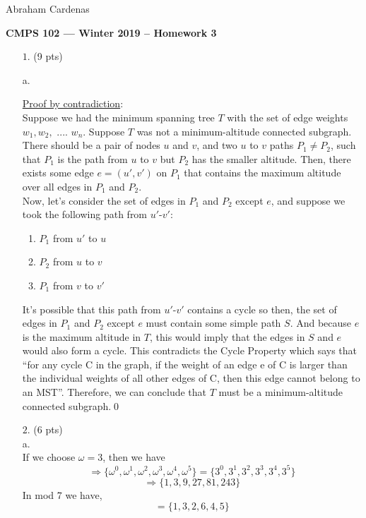 \documentclass[11pt]{article}
\begin{document}
\hfill Abraham Cardenas


\begin{center}
{\bf\Large CMPS 102 --- Winter 2019 --  Homework 3}
\end{center}

\newcommand{\Mod}[1]{\ \mathrm{mod}\ #1}

\begin{itemize}

\item[$1.$] (9 pts)

a.

\underline{Proof by contradiction}:\\
Suppose we had the minimum spanning tree $T$ with the set of edge weights $w_1, w_2,$ .... $w_n$.  Suppose $T$ was not a minimum-altitude connected subgraph. There should be a pair of nodes $u$ and $v$, and two $u$ to $v$ paths $P_1 \neq P_2$, such that $P_1$ is the path from $u$ to $v$ but $P_2$ has the smaller altitude. Then, there exists some edge $e = (u',v')$ on $P_1$ that contains the maximum altitude over all edges in $P_1$ and $P_2$.\\ 
Now, let's consider the set of edges in $P_1$ and $P_2$ except $e$, and suppose we took the following path from $u'$-$v'$:
\begin{enumerate}
  \item $P_1$ from $u'$ to $u$
  \item $P_2$ from $u$ to $v$
  \item $P_1$ from $v$ to $v'$
\end{enumerate}
It's possible that this path from $u'$-$v'$ contains a cycle so then, the set of edges in $P_1$ and $P_2$ except $e$ must contain some simple path $S$. And because $e$ is the maximum altitude in $T$, this would imply that the edges in $S$ and $e$ would also form a cycle. This contradicts the Cycle Property which says that ``for any cycle C in the graph, if the weight of an edge e of C is larger than the individual weights of all other edges of C, then this edge cannot belong to an MST''. Therefore, we can conclude that $T$ must be a minimum-altitude connected subgraph.\hspace{7.5cm}\qed


\item[$2.$] (6 pts)\\
a.\\
If we choose $\omega = 3$, then we have $$\Rightarrow \big\{ \omega^0, \omega^1, \omega^2, \omega^3, \omega^4, \omega^5  \big\} = \big\{ 3^0,  3^1, 3^2, 3^3, 3^4, 3^5  \big\}$$ $$\Rightarrow \big\{ 1, 3, 9, 27, 81, 243  \big\}$$ In mod 7 we have, $$= \big\{ 1, 3, 2, 6, 4, 5  \big\}$$


\end{itemize}
\end{document}
